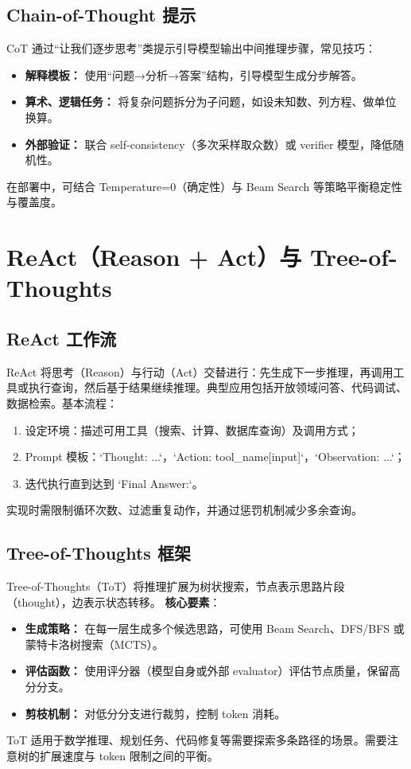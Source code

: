\documentclass[UTF8,zihao=-4]{ctexart}
\begin{document}
\subsection{Chain-of-Thought 提示}
CoT 通过“让我们逐步思考”类提示引导模型输出中间推理步骤，常见技巧：
\begin{itemize}
  \item \textbf{解释模板：} 使用“问题→分析→答案”结构，引导模型生成分步解答。
  \item \textbf{算术、逻辑任务：} 将复杂问题拆分为子问题，如设未知数、列方程、做单位换算。
  \item \textbf{外部验证：} 联合 self-consistency（多次采样取众数）或 verifier 模型，降低随机性。
\end{itemize}
在部署中，可结合 Temperature=0（确定性）与 Beam Search 等策略平衡稳定性与覆盖度。

\section{ReAct（Reason + Act）与 Tree-of-Thoughts}
\subsection{ReAct 工作流}
ReAct 将思考（Reason）与行动（Act）交替进行：先生成下一步推理，再调用工具或执行查询，然后基于结果继续推理。典型应用包括开放领域问答、代码调试、数据检索。基本流程：
\begin{enumerate}
  \item 设定环境：描述可用工具（搜索、计算、数据库查询）及调用方式；
  \item Prompt 模板：`Thought: ...`，`Action: tool_name[input]`，`Observation: ...`；
  \item 迭代执行直到达到 `Final Answer:`。
\end{enumerate}
实现时需限制循环次数、过滤重复动作，并通过惩罚机制减少多余查询。

\subsection{Tree-of-Thoughts 框架}
Tree-of-Thoughts（ToT）将推理扩展为树状搜索，节点表示思路片段（thought），边表示状态转移。 \textbf{核心要素}：
\begin{itemize}
  \item \textbf{生成策略：} 在每一层生成多个候选思路，可使用 Beam Search、DFS/BFS 或蒙特卡洛树搜索（MCTS）。
  \item \textbf{评估函数：} 使用评分器（模型自身或外部 evaluator）评估节点质量，保留高分分支。
  \item \textbf{剪枝机制：} 对低分分支进行裁剪，控制 token 消耗。
\end{itemize}
ToT 适用于数学推理、规划任务、代码修复等需要探索多条路径的场景。需要注意树的扩展速度与 token 限制之间的平衡。
\end{document}
